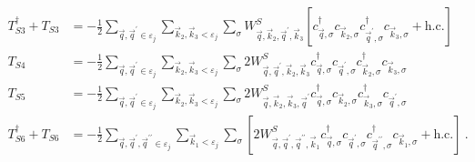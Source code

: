 \documentclass{revtex4-2}
\begin{document}
\begin{equation}\begin{aligned}
	T_{S3}^\dagger + T_{S3} &= - \frac{1}{2}\sum_{\vec q, \vec q^\prime \in \varepsilon_j}\sum_{\vec k_2, \vec k_3 < \varepsilon_j}\sum_{\sigma} W^S_{\vec q,\vec k_2, \vec q^\prime, \vec k_3}\left[c^\dagger_{\vec q,\sigma}c_{\vec k_2,\sigma}c^\dagger_{\vec q^\prime,\sigma}c_{\vec k_3,\sigma} + \text{h.c.}\right]\\
	T_{S4} &= - \frac{1}{2}\sum_{\vec q, \vec q^\prime \in \varepsilon_j}\sum_{\vec k_2, \vec k_3 < \varepsilon_j}\sum_{\sigma}2W^S_{\vec q,\vec q^\prime,\vec k_2,\vec k_3} c^\dagger_{\vec q,\sigma}c_{\vec q^\prime,\sigma}c^\dagger_{\vec k_2,\sigma}c_{\vec k_3,\sigma}\\
	T_{S5} &= - \frac{1}{2}\sum_{\vec q, \vec q^\prime \in \varepsilon_j}\sum_{\vec k_2, \vec k_3 < \varepsilon_j}\sum_{\sigma}2W^S_{\vec q,\vec k_2,\vec k_3,\vec q^\prime} c^\dagger_{\vec q,\sigma}c_{\vec k_2,\sigma}c^\dagger_{\vec k_3,\sigma}c_{\vec q^\prime,\sigma}\\
	T_{S6}^\dagger + T_{S6} &= - \frac{1}{2}\sum_{\vec q, \vec q^\prime, \vec q^{\prime\prime} \in \varepsilon_j}\sum_{\vec k_1 < \varepsilon_j}\sum_{\sigma}\left[2W^S_{\vec q,\vec q^\prime,\vec q^{\prime\prime}, \vec k_1}c^\dagger_{\vec q,\sigma}c_{\vec q^\prime,\sigma}c^\dagger_{\vec q^{\prime\prime},\sigma}c_{\vec k_1,\sigma} + \text{h.c.}\right]~.\\
\end{aligned}\end{equation}
\end{document}

